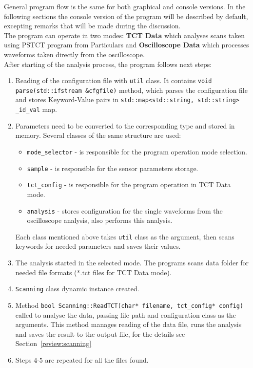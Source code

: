 \documentclass[12pt,oneside,notitlepage,abstracton,a4paper]{scrartcl}
\begin{document}
General program flow is the same for both graphical and console versions. In the following sections the console version of the program will be described by default, excepting remarks that will be made during the discussion.
\\ \indent The program can operate in two modes: \textbf{TCT Data} which analyses scans taken using PSTCT program from Particulars and \textbf{Oscilloscope Data} which processes waveforms taken directly from the oscilloscope.
\\ \indent After starting of the analysis process, the program follows next steps:
\begin{enumerate}
\item Reading of the configuration file with \lstinline$util$ class. It contains \lstinline$void parse(std::ifstream &cfgfile)$ method, which parses the configuration file and stores Keyword-Value pairs in \lstinline$std::map<std::string, std::string> _id_val$ map.
\item Parameters need to be converted to the corresponding type and stored in memory. Several classes of the same structure are used:
\begin{itemize}
\item \lstinline$mode_selector$ - is responsible for the program operation mode selection.
\item \lstinline$sample$ - is responsible for the sensor parameters storage.
\item \lstinline$tct_config$ - is responsible for the program operation in TCT Data mode.
\item \lstinline$analysis$ - stores configuration for the single waveforms from the oscilloscope analysis, also performs this analysis.
\end{itemize}
Each class mentioned above takes \lstinline$util$ class as the argument, then scans keywords for needed parameters and saves their values.
\item The analysis started in the selected mode. The programs scans data folder for needed file formats (*.tct files for TCT Data mode). 
\item \lstinline$Scanning$ class dynamic instance created.
\item Method \lstinline$bool Scanning::ReadTCT(char* filename, tct_config* config)$ called to analyse the data, passing file path and configuration class as the arguments. This method manages reading of the data file, runs the analysis and saves the result to the output file, for the details see Section~\ref{review:scanning}
\item Steps 4-5 are repeated for all the files found.
\end{enumerate} 
\end{document}
